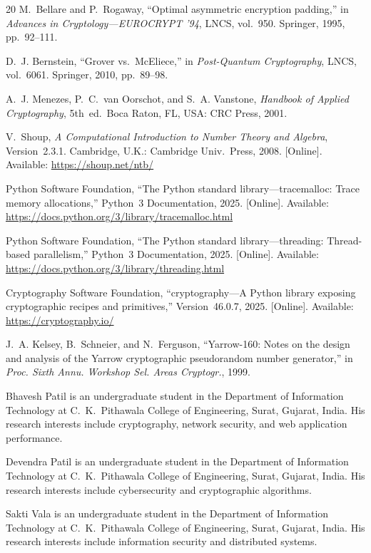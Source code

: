 \documentclass[journal]{IEEEtran}
\begin{document}
\begin{thebibliography}{20}
M.~Bellare and P.~Rogaway, ``Optimal asymmetric encryption padding,'' in \textit{Advances in Cryptology---EUROCRYPT '94}, LNCS, vol.~950. Springer, 1995, pp.~92--111.

D.~J. Bernstein, ``Grover vs.\ McEliece,'' in \textit{Post-Quantum Cryptography}, LNCS, vol.~6061. Springer, 2010, pp.~89--98.

A.~J. Menezes, P.~C.~van Oorschot, and S.~A. Vanstone, \textit{Handbook of Applied Cryptography}, 5th~ed.\ Boca Raton, FL, USA: CRC Press, 2001.

V.~Shoup, \textit{A Computational Introduction to Number Theory and Algebra}, Version~2.3.1. Cambridge, U.K.: Cambridge Univ.\ Press, 2008. [Online]. Available: \url{https://shoup.net/ntb/}

Python Software Foundation, ``The Python standard library---tracemalloc: Trace memory allocations,'' Python~3 Documentation, 2025. [Online]. Available: \url{https://docs.python.org/3/library/tracemalloc.html}

Python Software Foundation, ``The Python standard library---threading: Thread-based parallelism,'' Python~3 Documentation, 2025. [Online]. Available: \url{https://docs.python.org/3/library/threading.html}

Cryptography Software Foundation, ``cryptography---A Python library exposing cryptographic recipes and primitives,'' Version~46.0.7, 2025. [Online]. Available: \url{https://cryptography.io/}

J.~A. Kelsey, B.~Schneier, and N.~Ferguson, ``Yarrow-160: Notes on the design and analysis of the Yarrow cryptographic pseudorandom number generator,'' in \textit{Proc. Sixth Annu. Workshop Sel. Areas Cryptogr.}, 1999.

\end{thebibliography}


\begin{IEEEbiographynophoto}{Bhavesh Patil}
is an undergraduate student in the Department of Information Technology at C.~K.~Pithawala College of Engineering, Surat, Gujarat, India. His research interests include cryptography, network security, and web application performance.
\end{IEEEbiographynophoto}

\begin{IEEEbiographynophoto}{Devendra Patil}
is an undergraduate student in the Department of Information Technology at C.~K.~Pithawala College of Engineering, Surat, Gujarat, India. His research interests include cybersecurity and cryptographic algorithms.
\end{IEEEbiographynophoto}

\begin{IEEEbiographynophoto}{Sakti Vala}
is an undergraduate student in the Department of Information Technology at C.~K.~Pithawala College of Engineering, Surat, Gujarat, India. His research interests include information security and distributed systems.
\end{IEEEbiographynophoto}
\end{document}
